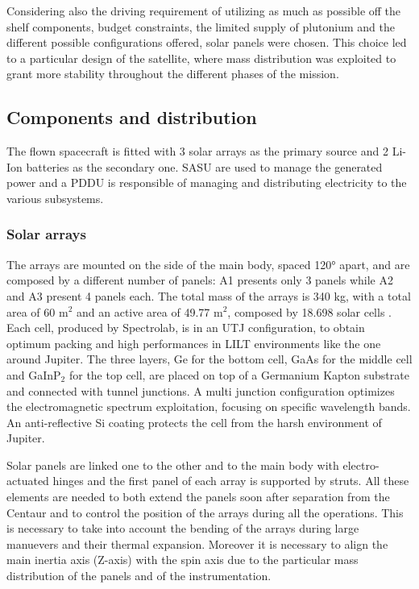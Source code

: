 Considering also the driving requirement of utilizing as much as possible off the shelf components, budget constraints, the limited supply of plutonium and the different possible configurations offered, solar panels were chosen. This choice led to a particular design of the satellite, where mass distribution was exploited to grant more stability throughout the different phases of the mission.  

\subsection{Components and distribution}
\label{subsec:components_and_distribution}

The flown spacecraft is fitted with 3 solar arrays as the primary source and 2 Li-Ion batteries as the secondary one. SASU are used to manage the generated power and a PDDU is responsible of managing and distributing electricity to the various subsystems. 
\subsubsection{Solar arrays}
\label{susubsec:solar_arrays}

The arrays are mounted on the side of the main body, spaced 120° apart, and are composed by a different number of panels: A1 presents only 3 panels while A2 and A3 present 4 panels each. The total mass of the arrays is 340 kg, with a total area of 60 m$^2$ \cite{arrays_mass} and an active area of 49.77 m$^2$, composed by 18.698 solar cells \cite{masses_ref}. 
Each cell, produced by Spectrolab, is in an UTJ configuration, to obtain optimum packing and high performances in LILT environments like the one around Jupiter. The three layers, Ge for the bottom cell, GaAs for the middle cell and GaInP$_2$ for the top cell, are placed on top of a Germanium Kapton substrate and connected with tunnel junctions. A multi junction configuration optimizes the electromagnetic spectrum exploitation, focusing on specific wavelength bands. An anti-reflective Si coating protects the cell from the harsh environment of Jupiter. 

 Solar panels are linked one to the other and to the main body with electro-actuated hinges and the first panel of each array is supported by struts. All these elements are needed to both extend the panels soon after separation from the Centaur and to control the position of the arrays during all the operations. This is necessary to take into account the bending of the arrays during large manuevers and their thermal expansion. Moreover it is necessary to align the main inertia axis (Z-axis) with the spin axis due to the particular mass distribution of the panels and of the instrumentation.


